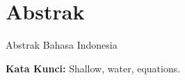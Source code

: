 \chapter*{Abstrak}

 Abstrak Bahasa Indonesia
  
\vspace{0.5 cm}
\begin{flushleft}
{\textbf{Kata Kunci:} Shallow, water, equations.}
\end{flushleft}